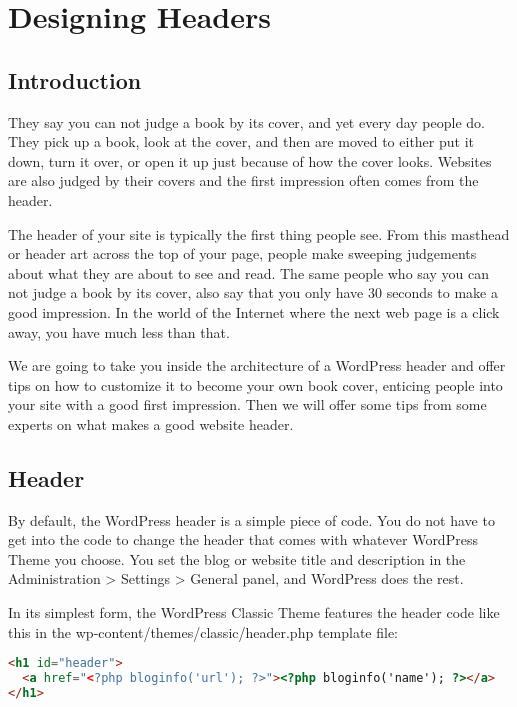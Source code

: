 \section{Designing Headers}

\subsection{Introduction}

They say you can not judge a book by its cover, and yet every day people do. They pick up a book, look at the cover, and then are moved to either put it down, turn it over, or open it up just because of how the cover looks. Websites are also judged by their covers and the first impression often comes from the header.

The header of your site is typically the first thing people see. From this masthead or header art across the top of your page, people make sweeping judgements about what they are about to see and read. The same people who say you can not judge a book by its cover, also say that you only have 30 seconds to make a good impression. In the world of the Internet where the next web page is a click away, you have much less than that.


We are going to take you inside the architecture of a WordPress header and offer tips on how to customize it to become your own book cover, enticing people into your site with a good first impression. Then we will offer some tips from some experts on what makes a good website header.

\subsection{Header}

By default, the WordPress header is a simple piece of code. You do not have to get into the code to change the header that comes with whatever WordPress Theme you choose. You set the blog or website title and description in the Administration > Settings > General panel, and WordPress does the rest.

In its simplest form, the WordPress Classic Theme features the header code like this in the wp-content/themes/classic/header.php template file:

\begin{lstlisting}[language=HTML]
<h1 id="header">
  <a href="<?php bloginfo('url'); ?>"><?php bloginfo('name'); ?></a>
</h1>
\end{lstlisting}

